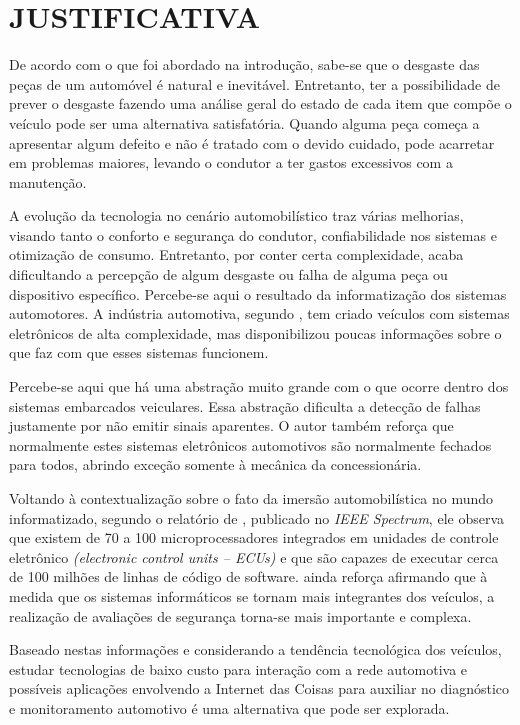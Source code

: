 \chapter{JUSTIFICATIVA}\label{CAP2}

De acordo com o que foi abordado na introdução, sabe-se que o desgaste das peças de um automóvel é natural e inevitável. Entretanto, ter a possibilidade de prever o desgaste fazendo uma análise geral do estado de cada item que compõe o veículo pode ser uma alternativa satisfatória. Quando alguma peça começa a apresentar algum defeito e não é tratado com o devido cuidado, pode acarretar em problemas maiores, levando o condutor a ter gastos excessivos com a manutenção.

A evolução da tecnologia no cenário automobilístico traz várias melhorias, visando tanto o conforto e segurança do condutor, confiabilidade nos sistemas e otimização de consumo. Entretanto, por conter certa complexidade, acaba dificultando a percepção de algum desgaste ou falha de alguma peça ou dispositivo específico. Percebe-se aqui o resultado da informatização dos sistemas automotores. A indústria automotiva, segundo , tem criado veículos com sistemas eletrônicos de alta complexidade, mas disponibilizou poucas informações sobre o que faz com que esses sistemas funcionem.

Percebe-se aqui que há uma abstração muito grande com o que ocorre dentro dos sistemas embarcados veiculares. Essa abstração dificulta a detecção de falhas justamente por não emitir sinais aparentes. O autor também reforça que normalmente estes sistemas eletrônicos automotivos são normalmente fechados para todos, abrindo exceção somente à mecânica da concessionária.

Voltando à contextualização sobre o fato da imersão automobilística no mundo informatizado, segundo o relatório de , publicado no \textit{IEEE Spectrum}, ele observa que existem de 70 a 100 microprocessadores integrados em unidades de controle eletrônico \textit{(electronic control units – ECUs)} e que são capazes de executar cerca de 100 milhões de linhas de código de software.  ainda reforça afirmando que à medida que os sistemas informáticos se tornam mais integrantes dos veículos, a realização de avaliações de segurança torna-se mais importante e complexa.

Baseado nestas informações e considerando a tendência tecnológica dos veículos, estudar tecnologias de baixo custo para interação com a rede automotiva e possíveis aplicações envolvendo a Internet das Coisas para auxiliar no diagnóstico e monitoramento automotivo é uma alternativa que pode ser explorada. 